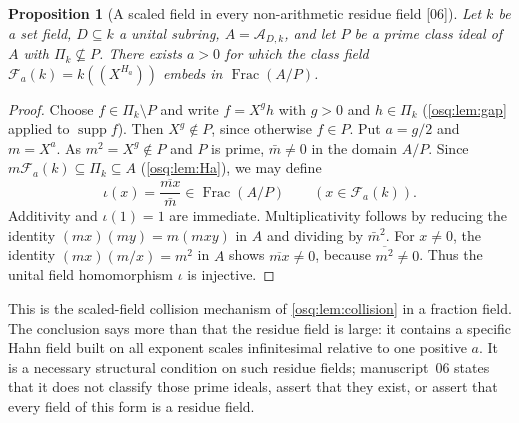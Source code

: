 \documentclass[11pt,letterpaper]{article}
\numberwithin{equation}{section}
\newtheorem{proposition}[proposition]{Proposition}
\theoremstyle{definition}
\theoremstyle{remark}
\theoremstyle{plain}
\newcommand{\A}{\mathcal A}          %
\newcommand{\FF}{\mathscr F}         %
\newcommand{\hahn}[2]{#1(\!(X^{#2})\!)}
\newcommand{\supp}{\operatorname{supp}}
\newcommand{\Frac}{\operatorname{Frac}}
\newcommand{\src}[1]{\textup{\textsf{[#1]}}}
\begin{document}
\begin{proposition}[A scaled field in every non-arithmetic residue field \src{06}]
\label{osq:if:prop:reservoir}
Let $k$ be a set field, $D\subseteq k$ a unital subring, $A=\A_{D,k}$, and let $P$ be a
prime class ideal of $A$ with $\Pi_k\not\subseteq P$. There exists $a>0$ for which the
class field $\FF_a(k)=\hahn{k}{H_a}$ embeds in $\Frac(A/P)$.
\end{proposition}

\begin{proof}
Choose $f\in\Pi_k\setminus P$ and write $f=X^gh$ with $g>0$ and $h\in\Pi_k$
(\cref{osq:lem:gap} applied to $\supp f$). Then $X^g\notin P$, since otherwise $f\in P$.
Put $a=g/2$ and $m=X^a$. As $m^2=X^g\notin P$ and $P$ is prime, $\bar m\ne0$ in the domain
$A/P$. Since $m\FF_a(k)\subseteq\Pi_k\subseteq A$ (\cref{osq:lem:Ha}), we may define
\[
 \iota(x)=\frac{\overline{mx}}{\bar m}\in\Frac(A/P)\qquad(x\in\FF_a(k)).
\]
Additivity and $\iota(1)=1$ are immediate. Multiplicativity follows by reducing the
identity $(mx)(my)=m(mxy)$ in $A$ and dividing by $\bar m^2$. For $x\ne0$, the identity
$(mx)(m/x)=m^2$ in $A$ shows $\overline{mx}\ne0$, because $\overline{m^2}\ne0$. Thus the
unital field homomorphism $\iota$ is injective.
\end{proof}

This is the scaled-field collision mechanism of \cref{osq:lem:collision} in a fraction
field. The conclusion says more than that the residue field is large: it contains a
specific Hahn field built on all exponent scales infinitesimal relative to one positive
$a$. It is a necessary structural condition on such residue fields; manuscript~06 states
that it does not classify those prime ideals, assert that they exist, or assert that
every field of this form is a residue field.
\end{document}
